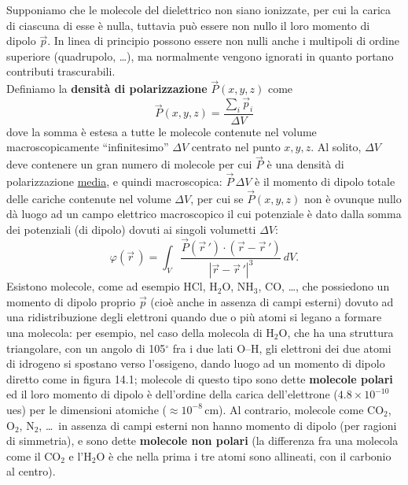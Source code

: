 Supponiamo che le molecole del dielettrico non siano ionizzate, per cui la
carica di ciascuna di esse \`e nulla, tuttavia pu\`o essere non nullo il loro
momento di dipolo $\vec p$.
In linea di principio possono essere non nulli anche i multipoli di ordine
superiore (quadrupolo, \dots), ma normalmente vengono ignorati in quanto portano
contributi trascurabili.\\
Definiamo la \textbf{densit\`a di polarizzazione} $\vec P(x,y,z)$ come
\begin{equation}
  \vec P(x,y,z)=\frac{\sum_i\vec p_i}{\Delta V}
  \tag{14.6}
\end{equation}
dove la somma \`e estesa a tutte le molecole contenute nel volume
macroscopicamente ``infinitesimo'' $\Delta V$ centrato nel punto $x,y,z$. Al
solito, $\Delta V$ deve contenere un gran numero di molecole per cui $\vec P$
\`e una densit\`a di polarizzazione \underline{media}, e quindi macroscopica:
$\vec P\,\Delta V$ \`e il momento di dipolo totale delle cariche contenute nel
volume $\Delta V$, per cui se $\vec P(x,y,z)$ non \`e ovunque nullo d\`a luogo
ad un campo elettrico macroscopico il cui potenziale \`e dato dalla somma dei
potenziali (di dipolo) dovuti ai singoli volumetti $\Delta V$:
\begin{equation}
  \varphi(\vec r\,)=\int_V\frac{\vec P(\vec r\,')\cdot(\vec r-\vec r\,')}
  {|\vec r-\vec r\,'|^3}\,dV.
  \tag{14.7}
\end{equation}
Esistono molecole, come ad esempio HCl, H$_2$O, NH$_3$, CO, \dots, che
possiedono un momento di dipolo proprio $\vec p$ (cio\`e anche in assenza di
campi esterni) dovuto ad una ridistribuzione degli elettroni quando due o pi\`u
atomi si legano a formare una molecola: per esempio, nel caso della molecola di
H$_2$O, che ha una struttura triangolare, con un angolo di 105$^\circ$ fra i due
lati O--H, gli elettroni dei due atomi di idrogeno si spostano verso l'ossigeno,
dando luogo ad un momento di dipolo diretto come in figura 14.1; molecole di
questo tipo sono dette \textbf{molecole polari} ed il loro momento di dipolo \`e
dell'ordine della carica dell'elettrone ($4.8\times10^{-10}$\,ues) per le
dimensioni atomiche ($\approx10^{-8}$\,cm).
Al contrario, molecole come CO$_2$, O$_2$, N$_2$, \dots\ in assenza di campi
esterni non hanno momento di dipolo (per ragioni di simmetria), e sono dette
\textbf{molecole non polari} (la differenza fra una molecola come il CO$_2$ e
l'H$_2$O \`e che nella prima i tre atomi sono allineati, con il carbonio al
centro).

